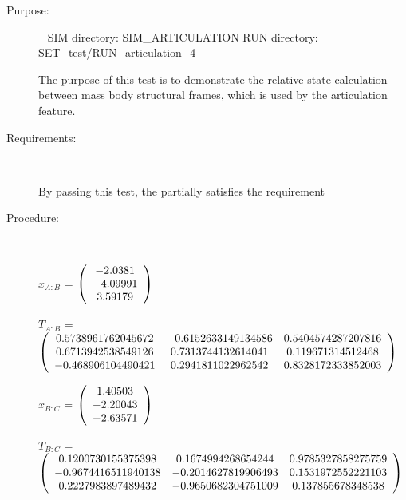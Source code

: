 \begin{description}

\item[Purpose:] \ \newline
SIM directory: SIM\_ARTICULATION
RUN directory: SET\_test/RUN\_articulation\_4

The purpose of this test is to demonstrate the relative state calculation
between mass body structural frames, which is used by the articulation
feature.

\item[Requirements:] \ \newline

By passing this test, the \ModelDesc partially satisfies
the requirement 

\item[Procedure:] \ \newline

$x_{A:B}$ = $\left( \begin{array} {ccc}    -2.0381 \\   -4.09991 \\    3.59179
\end{array} \right)\\ \\$

$T_{A:B}$ = $\left( \begin{array} {ccc}
   0.5738961762045672 & -0.6152633149134586 & 0.5404574287207816 \\
   0.6713942538549126 & 0.7313744132614041 & 0.119671314512468 \\
   -0.468906104490421 & 0.2941811022962542 & 0.8328172333852003 \\
\end{array} \right)\\ \\$

$x_{B:C}$ = $\left( \begin{array} {ccc}    1.40503 \\   -2.20043 \\   -2.63571
\end{array} \right)\\ \\$

$T_{B:C}$ = $\left( \begin{array} {ccc}
   0.1200730155375398 & 0.1674994268654244 & 0.9785327858275759 \\
   -0.9674416511940138 & -0.2014627819906493 & 0.1531972552221103 \\
   0.2227983897489432 & -0.9650682304751009 & 0.137855678348538 \\
\end{array} \right)\\ \\$


\end{description}
